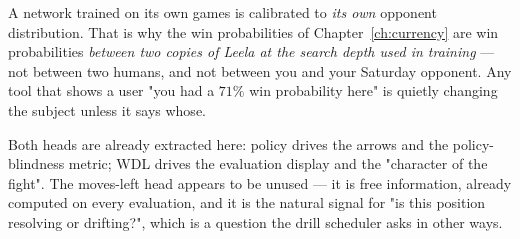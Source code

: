 \begin{pitfall}
A network trained on its own games is calibrated to \emph{its own} opponent distribution. That
is why the win probabilities of Chapter~\ref{ch:currency} are win probabilities \emph{between
two copies of Leela at the search depth used in training} --- not between two humans, and not
between you and your Saturday opponent. Any tool that shows a user "you had a $71\%$ win
probability here" is quietly changing the subject unless it says whose.
\end{pitfall}

\begin{repobox}[title={in this repository}]
Both heads are already extracted here: policy drives the arrows and the policy-blindness
metric; WDL drives the evaluation display and the "character of the fight". The moves-left
head appears to be unused --- it is free information, already computed on every evaluation,
and it is the natural signal for "is this position resolving or drifting?", which is a
question the drill scheduler asks in other ways.
\end{repobox}

